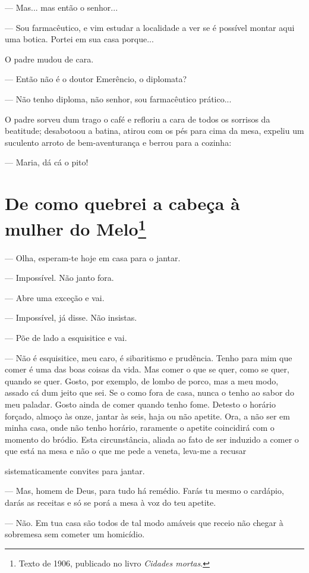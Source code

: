 --- Mas... mas então o senhor...

--- Sou farmacêutico, e vim estudar a localidade a ver se é possível
montar aqui uma botica. Portei em sua casa porque...

O padre mudou de cara.

--- Então não é o doutor Emerêncio, o diplomata?

--- Não tenho diploma, não senhor, sou farmacêutico prático...

O padre sorveu dum trago o café e refloriu a cara de todos os sorrisos
da beatitude; desabotoou a batina, atirou com os pés para cima da mesa,
expeliu um suculento arroto de bem-aventurança e berrou para a cozinha:

--- Maria, dá cá o pito!

\chapter{De como quebrei a cabeça à mulher do Melo\footnote[*]{Texto de 1906, publicado no livro \emph{Cidades mortas}.}}

--- Olha, esperam-te hoje em casa para o jantar.

--- Impossível. Não janto fora.

--- Abre uma exceção e vai.

--- Impossível, já disse. Não insistas.

--- Põe de lado a esquisitice e vai.

--- Não é esquisitice, meu caro, é sibaritismo e prudência. Tenho para
mim que comer é uma das boas coisas da vida. Mas comer o que se quer,
como se quer, quando se quer. Gosto, por exemplo, de lombo de porco, mas
a meu modo, assado cá dum jeito que sei. Se o como fora de casa, nunca o
tenho ao sabor do meu paladar. Gosto ainda de comer quando tenho fome.
Detesto o horário forçado, almoço às onze, jantar às seis, haja ou não
apetite. Ora, a não ser em minha casa, onde não tenho horário, raramente
o apetite coincidirá com o momento do bródio. Esta circunstância, aliada
ao fato de ser induzido a comer o que está na mesa e não o que me pede a
veneta, leva-me a recusar

sistematicamente convites para jantar.

--- Mas, homem de Deus, para tudo há remédio. Farás tu mesmo o cardápio,
darás as receitas e só se porá a mesa à voz do teu apetite.

--- Não. Em tua casa são todos de tal modo amáveis que receio não chegar
à sobremesa sem cometer um homicídio.

